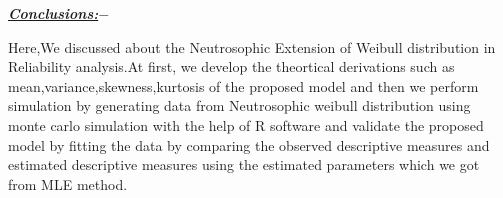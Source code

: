 \documentclass[12pt,a4paper,oneside]{article}
\begin{document}
\vspace*{2cm}
\begin{singlespace}
\begin{Large}
\textrm{\textit{\textbf{\underline{Conclusions:$-$}}}}
\end{Large}
\end{singlespace}
Here,We discussed about the Neutrosophic Extension of Weibull distribution in Reliability analysis.At first, we develop the theortical derivations such as mean,variance,skewness,kurtosis of the proposed model and then we perform simulation by generating data from Neutrosophic weibull distribution using monte carlo simulation with the help of R software and validate the proposed model by fitting the data by comparing the observed descriptive measures and estimated descriptive measures using the estimated parameters which we got from MLE method.
\newpage
\end{document}

